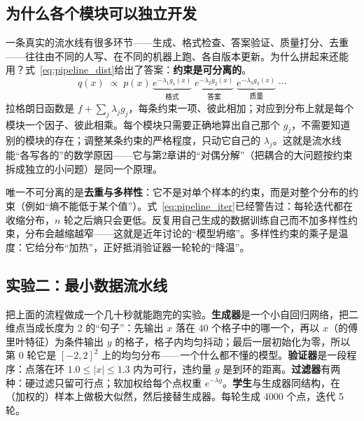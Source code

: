 \subsection{为什么各个模块可以独立开发}

一条真实的流水线有很多环节——生成、格式检查、答案验证、质量打分、去重——往往由不同的人写、在不同的机器上跑、各自版本更新。为什么拼起来还能用？式~\eqref{eq:pipeline_dist}给出了答案：\textbf{约束是可分离的}。
\begin{equation}
    q(x) \;\propto\; p(x)\,\underbrace{e^{-\lambda_1 g_1(x)}}_{\text{格式}}\;\underbrace{e^{-\lambda_2 g_2(x)}}_{\text{答案}}\;\underbrace{e^{-\lambda_3 g_3(x)}}_{\text{质量}}\;\cdots
\end{equation}
拉格朗日函数是 $f + \sum_j \lambda_j g_j$，每条约束一项、彼此相加；对应到分布上就是每个模块一个因子、彼此相乘。每个模块只需要正确地算出自己那个 $g_j$，不需要知道别的模块的存在；调整某条约束的严格程度，只动它自己的 $\lambda_j$。这就是流水线能“各写各的”的数学原因——它与第2章讲的“对偶分解”（把耦合的大问题按约束拆成独立的小问题）是同一个原理。

唯一不可分离的是\textbf{去重与多样性}：它不是对单个样本的约束，而是对整个分布的约束（例如“熵不能低于某个值”）。式~\eqref{eq:pipeline_iter}已经警告过：每轮迭代都在收缩分布，$n$ 轮之后熵只会更低。反复用自己生成的数据训练自己而不加多样性约束，分布会越缩越窄——这就是近年讨论的“模型坍缩”。多样性约束的乘子是温度：它给分布“加热”，正好抵消验证器一轮轮的“降温”。

\subsection{实验二：最小数据流水线}

把上面的流程做成一个几十秒就能跑完的实验。\textbf{生成器}是一个小自回归网络，把二维点当成长度为 2 的“句子”：先输出 $x$ 落在 40 个格子中的哪一个，再以 $x$（的傅里叶特征）为条件输出 $y$ 的格子，格子内均匀抖动；最后一层初始化为零，所以第 0 轮它是 $[-2, 2]^2$ 上的均匀分布——一个什么都不懂的模型。\textbf{验证器}是一段程序：点落在环 $1.0 \le |x| \le 1.3$ 内为可行，违约量 $g$ 是到环的距离。\textbf{过滤器}有两种：硬过滤只留可行点；软加权给每个点权重 $e^{-\lambda g}$。\textbf{学生}与生成器同结构，在（加权的）样本上做极大似然，然后接替生成器。每轮生成 4000 个点，迭代 5 轮。

